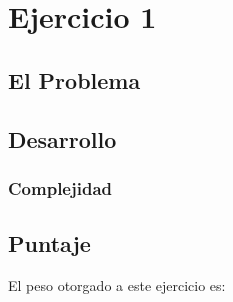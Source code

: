 \section{Ejercicio 1}
\subsection{El Problema}

\subsection{Desarrollo}

\subsubsection{Complejidad}

\subsection{Puntaje}
El peso otorgado a este ejercicio es:
